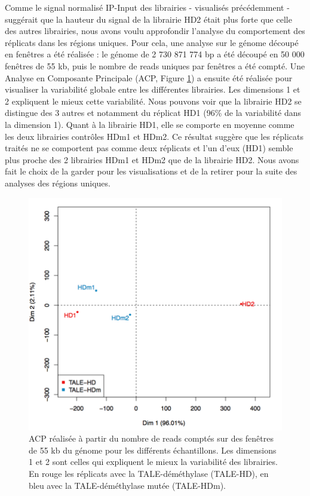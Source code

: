 \documentclass[a4paper,12pt,times]{report}
\newcommand{\scaption}[1]{\caption{\footnotesize{#1}}}
\begin{document}
    \newpage
    Comme le signal normalisé IP-Input des librairies - visualisés précédemment - suggérait que la hauteur du signal de la librairie HD2 était plus forte que celle des autres librairies, nous avons voulu approfondir l'analyse du comportement des réplicats dans les régions uniques.
    Pour cela,  une analyse sur le génome découpé en fenêtres a été réalisée : le génome de 2 730 871 774 bp a été découpé en 50 000 fenêtres de 55 kb, puis le nombre de reads uniques par fenêtres a été compté. 
   Une Analyse en Composante Principale (ACP, Figure \ref{ACP1}) a ensuite été réalisée pour visualiser la variabilité globale entre les différentes librairies.
   Les dimensions 1 et 2 expliquent le mieux cette variabilité. Nous pouvons voir que la librairie HD2 se distingue des 3 autres et notamment du réplicat HD1 (96\% de la variabilité dans la dimension 1).
   \newline Quant à la librairie HD1, elle se comporte en moyenne comme les deux librairies contrôles HDm1 et HDm2.
    Ce résultat suggère que les réplicats traités ne se comportent pas comme deux réplicats et l'un d'eux (HD1) semble plus proche des 2 librairies HDm1 et HDm2 que de la librairie HD2.
     Nous avons fait le choix de la garder pour les visualisations et de la retirer pour la suite des analyses des régions uniques.
 
   \begin{figure}[!h]
    \centering
    \includegraphics[scale=0.32]{ACP_uniques.png}
    \scaption{ACP réalisée à partir du nombre de reads comptés sur des fenêtres de 55 kb du génome pour les différents échantillons. Les dimensions 1 et 2 sont celles qui expliquent le mieux la variabilité des librairies. En rouge les réplicats avec la TALE-déméthylase (TALE-HD), en bleu avec la TALE-déméthylase mutée (TALE-HDm).}
    \label{ACP1}
   \end{figure}
\end{document}
